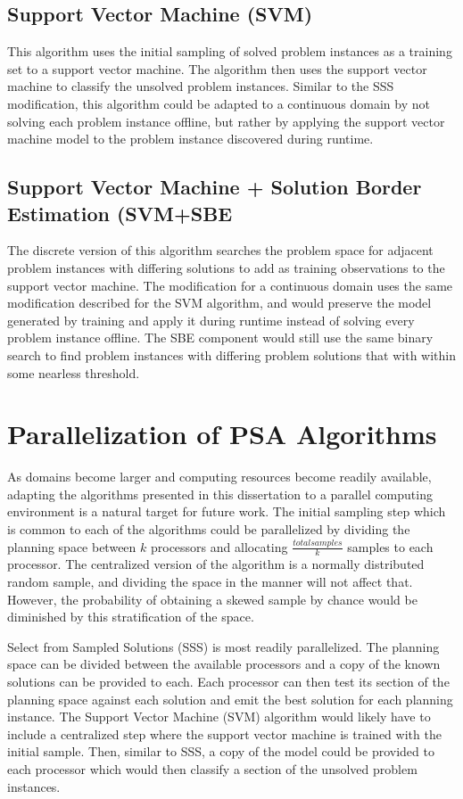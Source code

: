 \subsection{Support Vector Machine (SVM)}
This algorithm uses the initial sampling of solved problem instances as a training set to a support vector machine.  The algorithm then uses the support vector machine to classify the unsolved problem instances.  Similar to the SSS modification, this algorithm could be adapted to a continuous domain by not solving each problem instance offline, but rather by applying the support vector machine model to the problem instance discovered during runtime.

\subsection{Support Vector Machine + Solution Border Estimation (SVM+SBE}
The discrete version of this algorithm searches the problem space for adjacent problem instances with differing solutions to add as training observations to the support vector machine.  The modification for a continuous domain uses the same modification described for the SVM algorithm, and would preserve the model generated by training and apply it during runtime instead of solving every problem instance offline.  The SBE component would still use the same binary search to find problem instances with differing problem solutions that with within some nearless threshold.

\section{Parallelization of PSA Algorithms}

As domains become larger and computing resources become  readily available, adapting the algorithms presented in this dissertation to a parallel computing environment is a natural target for future work.  The initial sampling step which is common to each of the algorithms could be parallelized by dividing the planning space between $k$ processors and allocating $\frac{total samples}{k}$ samples to each processor. The centralized version of the algorithm is a normally distributed random sample, and dividing the space in the manner will not affect that.  However, the probability of obtaining a skewed sample by chance would be diminished by this stratification of the space.

Select from Sampled Solutions (SSS) is most readily parallelized.  The planning space can be divided between the available processors and a copy of the known solutions can be provided to each.  Each processor can then test its section of the planning space against each solution and emit the best solution for each planning instance.  The Support Vector Machine (SVM) algorithm would likely have to include a centralized step where the support vector machine is trained with the initial sample.  Then, similar to SSS, a copy of the model could be provided to each processor which would then classify a section of the unsolved problem instances.

